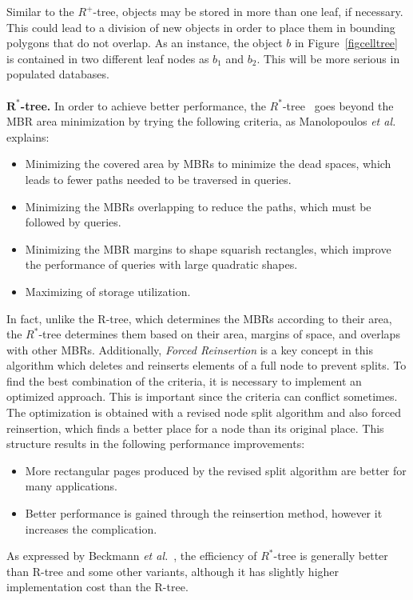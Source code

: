 \documentclass[a4paper,12pt]{article}
\begin{document}
Similar to the $R^+$-tree, objects may be stored in more than one leaf, if necessary. This could lead to a division of new objects in order to place them in bounding polygons that do not overlap. 
As an instance, the object $b$ in Figure~\ref{figcelltree} is contained in two different leaf nodes as $b_1$ and $b_2$.
This will be more serious in populated databases. 
\\\\
\textbf{$\boldsymbol{R^*}$-tree.}
In order to achieve better performance, the $R^*$-tree~\cite{rstartree} goes beyond the MBR area minimization by trying the following criteria, as Manolopoulos \emph{et al.}~\cite{Manolopoulos:2005} explains:
\begin{itemize}
\item Minimizing the covered area by MBRs to minimize the dead spaces, which leads to fewer paths needed to be traversed in queries. 
\item Minimizing the MBRs overlapping to reduce the paths, which must be followed by queries.
\item Minimizing the MBR margins to shape squarish rectangles, which improve the performance of queries with large quadratic shapes.
\item Maximizing of storage utilization. 
\end{itemize}
In fact, unlike the R-tree, which determines the MBRs according to their area, the $R^*$-tree determines them based on their area, margins of space, and overlaps with other MBRs. Additionally, \textit{Forced Reinsertion} is a key concept in this algorithm which deletes and reinserts elements of a full node to prevent splits.
To find the best combination of the criteria, it is necessary to implement an optimized approach. This is important since the criteria can conflict sometimes. The optimization is obtained with a revised node split algorithm and also forced reinsertion, which finds a better place for a node than its original place. This structure results in the following performance improvements:
\begin{itemize}
\item More rectangular pages produced by the revised split algorithm are better for many applications.
\item Better performance is gained through the reinsertion method, however it increases the complication.
\end{itemize}
As expressed by Beckmann \emph{et al.}~\cite{rstartree}, the efficiency of $R^*$-tree is generally better than R-tree and some other variants, although it has slightly higher implementation cost than the R-tree.
\end{document}
